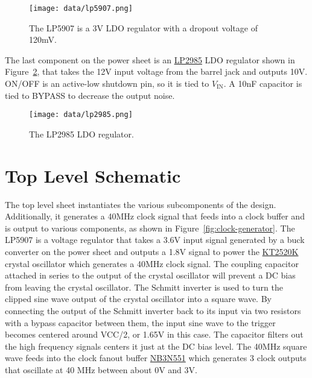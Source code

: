 \documentclass{default}
\begin{document}
\begin{figure}[h]
  \centering
  \texttt{[image: data/lp5907.png]}
  \caption{The LP5907 is a 3V LDO regulator with a dropout voltage of 120mV.}
  \label{fig:lp5907}
\end{figure}

The last component on the power sheet is an
\href{http://www.ti.com/lit/ds/symlink/lp2985.pdf}{LP2985} LDO regulator shown in
Figure~\ref{fig:lp2985}, that takes the 12V input voltage from the barrel jack and outputs
10V. ON/OFF is an active-low shutdown pin, so it is tied to $V_{\text{IN}}$. A 10nF capacitor is
tied to BYPASS to decrease the output noise.

\begin{figure}[h]
  \centering
  \texttt{[image: data/lp2985.png]}
  \caption{The LP2985 LDO regulator.}
  \label{fig:lp2985}
\end{figure}

\section{Top Level Schematic}



The top level sheet instantiates the various subcomponents of the design. Additionally, it generates
a 40MHz clock signal that feeds into a clock buffer and is output to various components, as shown in
Figure~\ref{fig:clock-generator}. The LP5907 is a voltage regulator that takes a 3.6V input signal
generated by a buck converter on the power sheet and outputs a 1.8V signal to power the
\href{https://media.digikey.com/pdf/Data\%20Sheets/AVX\%20PDFs/KT2520K40000DAW18TAS_Spec.pdf}{KT2520K}
crystal oscillator which generates a 40MHz clock signal. The coupling capacitor attached in series to
the output of the crystal oscillator will prevent a DC bias from leaving the crystal oscillator. The
Schmitt inverter is used to turn the clipped sine wave output of the crystal oscillator into a
square wave. By connecting the output of the Schmitt inverter back to its input via two resistors
with a bypass capacitor between them, the input sine wave to the trigger becomes centered around
VCC/2, or 1.65V in this case. The capacitor filters out the high frequency signals centers it just at
the DC bias level. The 40MHz square wave feeds into the clock fanout buffer
\href{http://www.onsemi.com/pub/Collateral/NB3N551-D.PDF}{NB3N551} which generates 3 clock outputs
that oscillate at 40 MHz between about 0V and 3V.
\end{document}
